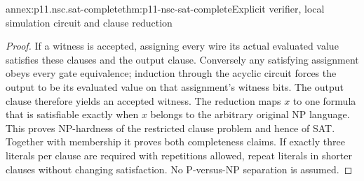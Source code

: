 \begin{annexitem}{annex:p11.nsc.sat-complete}{thm:p11-nsc-sat-complete}{Explicit verifier, local simulation circuit and clause reduction}
\begin{proof}
If a witness is accepted, assigning every wire its actual evaluated value
satisfies these clauses and the output clause. Conversely any satisfying
assignment obeys every gate equivalence; induction through the acyclic
circuit forces the output to be its evaluated value on that assignment's
witness bits. The output clause therefore yields an accepted witness.
The reduction maps \(x\) to one formula that is satisfiable exactly when
\(x\) belongs to the arbitrary original NP language. This proves NP-hardness
of the restricted clause problem and hence of SAT. Together with membership
it proves both completeness claims. If exactly three literals per clause
are required with repetitions allowed, repeat literals in shorter clauses
without changing satisfaction. No P-versus-NP separation is assumed.
\end{proof}
\end{annexitem}
